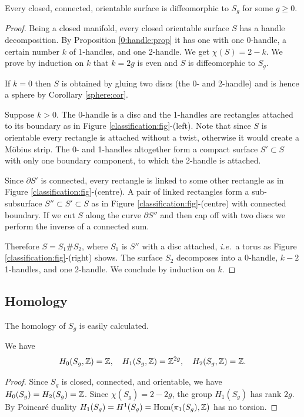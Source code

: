 \begin{teo} Every closed, connected, orientable surface is diffeomorphic to $S_g$ for some $g\geqslant 0$.
\end{teo}
\begin{proof}
Being a closed manifold, every closed orientable surface $S$ has a handle decomposition. By Proposition \ref{0:handle:prop} it has one with one 0-handle, a certain number $k$ of 1-handles, and one 2-handle. We get $\chi(S) = 2-k$. We prove by induction on $k$ that $k=2g$ is even and $S$ is diffeomorphic to $S_g$.

If $k=0$ then $S$ is obtained by gluing two discs (the 0- and 2-handle) and is hence a sphere by Corollary \ref{sphere:cor}.

Suppose $k>0$. The 0-handle is a disc and the 1-handles are rectangles attached to its boundary as in Figure \ref{classification:fig}-(left). Note that since $S$ is orientable every rectangle is attached without a twist, otherwise it would create a M\"obius strip. The 0- and 1-handles altogether form a compact surface $S'\subset S$ with only one boundary component, to which the 2-handle is attached.

Since $\partial S'$ is connected, every rectangle is linked to some other rectangle as in Figure \ref{classification:fig}-(centre). A pair of linked rectangles form a sub-subsurface $S''\subset S'\subset S$ as in Figure \ref{classification:fig}-(centre) with connected boundary. If we cut $S$ along the curve $\partial S''$ and then cap off with two discs we perform the inverse of a connected sum. 

Therefore $S = S_1\# S_2$, where $S_1$ is $S''$ with a disc attached, \emph{i.e.}~a torus  as Figure \ref{classification:fig}-(right) shows. The surface $S_2$ decomposes into a 0-handle, $k-2$ 1-handles, and one 2-handle. We conclude by induction on $k$.
\end{proof}

\subsection{Homology} \label{homolgy:surface:subsection}
The homology of $S_g$ is easily calculated.
\begin{prop}
We have
$$H_0(S_g,\mathbb{Z}) = \mathbb{Z}, \quad H_1(S_g,\mathbb{Z}) = \mathbb{Z}^{2g}, \quad H_2(S_g,\mathbb{Z}) = \mathbb{Z}.$$
\end{prop}
\begin{proof}
Since $S_g$ is closed, connected, and orientable, we have $H_0(S_g) = H_2(S_g) = \mathbb{Z}$. Since $\chi(S_g) = 2-2g$, the group $H_1(S_g)$ has rank $2g$. By Poincar\'e duality $H_1(S_g) = H^1(S_g) = {\rm Hom}(\pi_1(S_g),\mathbb{Z})$ has no torsion.
\end{proof}

